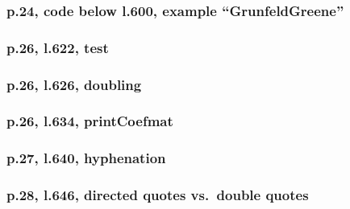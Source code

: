\documentclass[12pt,english]{scrartcl}
\begin{document}
\subsubsection{p.24, code below l.600, example ``GrunfeldGreene''}

\subsubsection{p.26, l.622, test}

\subsubsection{p.26, l.626, doubling}

\subsubsection{p.26, l.634, printCoefmat}

\subsubsection{p.27, l.640, hyphenation}

\subsubsection{p.28, l.646, directed quotes vs.\ double quotes}
\end{document}
